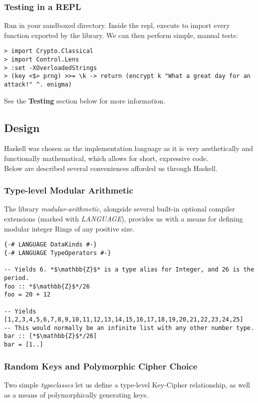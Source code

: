 \documentclass{article}
\begin{document}
\subsubsection{Testing in a REPL}
Run  in your sandboxed directory. Inside the repl,
execute  to import every function
exported by the library. We can then perform simple, manual tests:

\begin{lstlisting}
> import Crypto.Classical
> import Control.Lens
> :set -XOverloadedStrings
> (key <$> prng) >>= \k -> return (encrypt k "What a great day for an attack!" ^. enigma)
\end{lstlisting}

See the \textbf{Testing} section below for more information.

\subsection{Design}
Haskell was chosen as the implementation language as it is very
aesthetically and functionally mathematical,
which allows for short, expressive code.\\
Below are described several conveniences afforded us through Haskell.

\subsubsection{Type-level Modular Arithmetic}
The library \emph{modular-arithmetic}, alongside several built-in
optional compiler extensions (marked with \emph{LANGUAGE}),
provides us with a means for defining
modular integer Rings of any positive size.

\lstset{extendedchars=false,
escapeinside=**}
\begin{lstlisting}
{-# LANGUAGE DataKinds #-}
{-# LANGUAGE TypeOperators #-}

-- Yields 6. *$\mathbb{Z}$* is a type alias for Integer, and 26 is the period.
foo :: *$\mathbb{Z}$*/26
foo = 20 + 12

-- Yields [1,2,3,4,5,6,7,8,9,10,11,12,13,14,15,16,17,18,19,20,21,22,23,24,25]
-- This would normally be an infinite list with any other number type.
bar :: [*$\mathbb{Z}$*/26]
bar = [1..]
\end{lstlisting}

\subsubsection{Random Keys and Polymorphic Cipher Choice}
Two simple \emph{typeclasses} let us define a type-level Key-Cipher
relationship, as well as a means of polymorphically generating keys.
\end{document}
